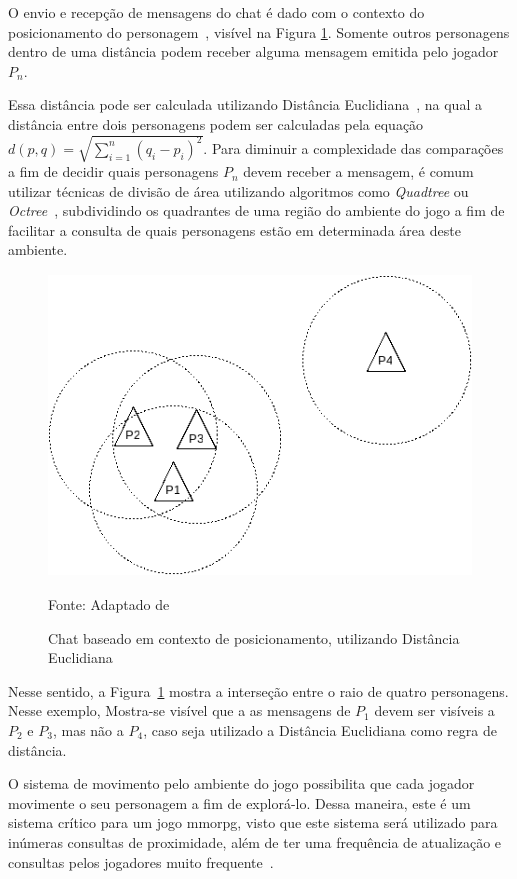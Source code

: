 O envio e recepção de mensagens do chat é dado com o contexto do posicionamento do personagem~\cite{albion_online_unite}, visível na Figura \ref{fig:chat}.
%
Somente outros personagens dentro de uma distância podem receber alguma mensagem emitida pelo jogador $P_n$.



Essa distância pode ser calculada utilizando Distância Euclidiana~\cite{Deza2009Aug}, na qual a distância entre dois personagens podem ser calculadas pela equação $d(p, q) = \sqrt{\sum_{i=1}^{n}(q_i - p_i)^2}$.
%
Para diminuir a complexidade das comparações a fim de decidir quais personagens $P_n$ devem receber a mensagem, é comum utilizar técnicas de divisão de área utilizando algoritmos como \textit{Quadtree} ou \textit{Octree}~\cite{Lengyel2011Jun}, subdividindo os quadrantes de uma região do ambiente do jogo a fim de facilitar a consulta de quais personagens estão em determinada área deste ambiente.


\begin{figure}[htb!]
\caption{Chat baseado em contexto de posicionamento, utilizando Distância Euclidiana}
\label{fig:chat}
\includegraphics[height=8cm]{img/cap2/chat.png}
\centering

Fonte: Adaptado de ~\cite{albion_online_unite}
\end{figure}



Nesse sentido, a Figura~\ref{fig:chat} mostra a interseção entre o raio de quatro personagens.
%
Nesse exemplo, Mostra-se visível que a as mensagens de $P_1$ devem ser visíveis a $P_2$ e $P_3$, mas não a $P_4$, caso seja utilizado a Distância Euclidiana como regra de distância.



O sistema de movimento pelo ambiente do jogo possibilita que cada jogador movimente o seu personagem a fim de explorá-lo.
%
Dessa maneira, este é um sistema crítico para um jogo \ac{mmorpg}, visto que este sistema será utilizado para inúmeras consultas de proximidade, além de ter uma frequência de atualização e consultas pelos jogadores muito frequente~\cite{albion_online_unite}.


